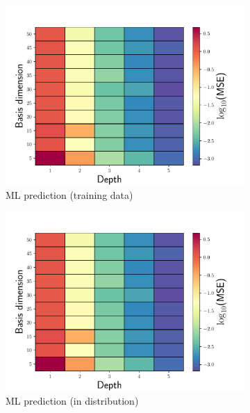 \documentclass[3p,computermodern,10pt]{elsarticle}
\begin{document}
\begin{figure}
\begin{center}
\begin{subfigure}[t]{0.32\textwidth}
\includegraphics[trim={0cm 0cm 0cm 0cm},clip,width=1.0\linewidth]{code/burgers/synapse_models/basis_study/MSE_training.pdf}
\caption{ML prediction (training data)}
\end{subfigure}
\begin{subfigure}[t]{0.32\textwidth}
\includegraphics[trim={0cm 0cm 0cm 0cm},clip,width=1.0\linewidth]{code/burgers/synapse_models/basis_study_indistribution/MSE_training.pdf}
\caption{ML prediction (in distribution)}
\end{subfigure}
\begin{subfigure}[t]{0.32\textwidth}

\end{subfigure}
\end{center}
\end{figure}
\end{document}
